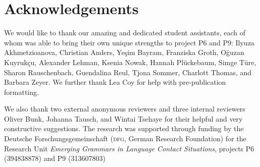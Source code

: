 \documentclass[output=paper,colorlinks,citecolor=brown]{langscibook}
\begin{document}
\section*{Acknowledgements}
We would like to thank our amazing and dedicated student assistants, each of whom was able to bring their own unique strengths to project P6 and P9: Ilyuza Akhmetzioanova, Christian Anders, Yeşim Bayram, Franziska Groth, Oğuzan Kuyrukçu, Alexander Lehman, Ksenia Nowak, Hannah Plückebaum, Simge Türe, Sharon Rauschenbach, Guendalina Reul, Tjona Sommer, Charlott Thomas, and Barbara Zeyer. We further thank Lea Coy for help with pre-publication formatting.

We also thank two external anonymous reviewers and three internal reviewers Oliver Bunk, Johanna Tausch, and Wintai Tsehaye for their helpful and very constructive suggestions. The research was supported through funding by the Deutsche Forschungsgemeinschaft (\textsc{dfg}, German Research Foundation) for the Research Unit \textit{Emerging Grammars in Language Contact Situations}, projects P6 (394838878) and P9 (313607803)

\sloppy
\printbibliography[heading=subbibliography,notkeyword=this]
\cleardoublepage
\end{document}
